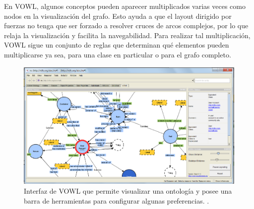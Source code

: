 En VOWL, algunos conceptos pueden aparecer multiplicados varias veces como nodos en la visualización del grafo. Esto ayuda a que el layout dirigido por fuerzas no tenga que ser forzado a resolver cruces de arcos complejos, por lo que relaja la visualización y facilita la navegabilidad. Para realizar tal multiplicación, VOWL sigue un conjunto de reglas que determinan qué elementos pueden multiplicarse ya sea, para una clase en particular o para el grafo completo.

\begin{figure}
	\centering
	\includegraphics[width=13cm]{imagenes/vowl.png}
	\caption{Interfaz de VOWL que permite visualizar una ontología y posee una barra de herramientas para configurar algunas preferencias. \cite{lohmann2016visualizing}.}
	\label{fig:vowl}
\end{figure}



